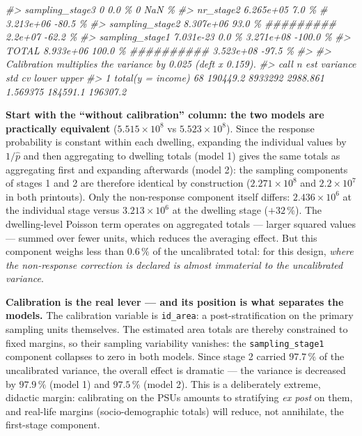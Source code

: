 \documentclass[
]{article}
\newenvironment{Shaded}{\begin{snugshade}}{\end{snugshade}}
\newcommand{\CommentTok}[1]{\textcolor[rgb]{0.56,0.35,0.01}{\textit{#1}}}
\begin{document}
\begin{Shaded}
\begin{Highlighting}[]
\CommentTok{\#\textgreater{}   sampling\_stage3               0    0.0 \%                           0       NaN \%}
\CommentTok{\#\textgreater{}   nr\_stage2             6.265e+05    7.0 \%  \#                3.213e+06     {-}80.5 \%}
\CommentTok{\#\textgreater{}   sampling\_stage2       8.307e+06   93.0 \%  \#\#\#\#\#\#\#\#\#          2.2e+07     {-}62.2 \%}
\CommentTok{\#\textgreater{}   sampling\_stage1       7.031e{-}23    0.0 \%                   3.271e+08    {-}100.0 \%}
\CommentTok{\#\textgreater{}   TOTAL                 8.933e+06  100.0 \%  \#\#\#\#\#\#\#\#\#\#       3.523e+08     {-}97.5 \%}
\CommentTok{\#\textgreater{} }
\CommentTok{\#\textgreater{}   Calibration multiplies the variance by 0.025 (deft x 0.159).}
\CommentTok{\#\textgreater{}                call  n      est variance      std       cv    lower    upper}
\CommentTok{\#\textgreater{} 1 total(y = income) 68 190449.2  8933292 2988.861 1.569375 184591.1 196307.2}
\end{Highlighting}
\end{Shaded}

\textbf{Start with the ``without calibration'' column: the two models
are practically equivalent} (\(5.515 \times 10^8\) vs
\(5.523 \times 10^8\)). Since the response probability is constant
within each dwelling, expanding the individual values by \(1/\hat p\)
and then aggregating to dwelling totals (model 1) gives the same totals
as aggregating first and expanding afterwards (model 2): the sampling
components of stages 1 and 2 are therefore identical by construction
(\(2.271 \times 10^8\) and \(2.2 \times 10^7\) in both printouts). Only
the non-response component itself differs: \(2.436 \times 10^6\) at the
individual stage versus \(3.213 \times 10^6\) at the dwelling stage
(\(+32\,\%\)). The dwelling-level Poisson term operates on aggregated
totals --- larger squared values --- summed over fewer units, which
reduces the averaging effect. But this component weighs less than
\(0.6\,\%\) of the uncalibrated total: for this design, \emph{where the
non-response correction is declared is almost immaterial to the
uncalibrated variance}.

\textbf{Calibration is the real lever --- and its position is what
separates the models.} The calibration variable is \texttt{id\_area}: a
post-stratification on the primary sampling units themselves. The
estimated area totals are thereby constrained to fixed margins, so their
sampling variability vanishes: the \texttt{sampling\_stage1} component
collapses to zero in both models. Since stage 2 carried \(97.7\,\%\) of
the uncalibrated variance, the overall effect is dramatic --- the
variance is decreased by \(97.9\,\%\) (model 1) and \(97.5\,\%\) (model
2). This is a deliberately extreme, didactic margin: calibrating on the
PSUs amounts to stratifying \emph{ex post} on them, and real-life
margins (socio-demographic totals) will reduce, not annihilate, the
first-stage component.
\end{document}
